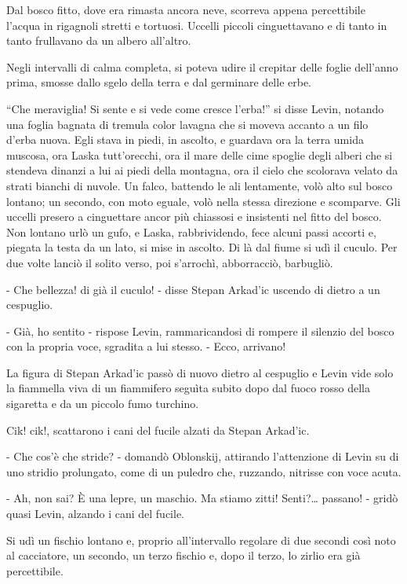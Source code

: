 Dal bosco fitto, dove era rimasta ancora neve, scorreva appena percettibile l'acqua in rigagnoli stretti e tortuosi. Uccelli piccoli cinguettavano e di tanto in tanto frullavano da un albero all'altro. 

Negli intervalli di calma completa, si poteva udire il crepitar delle foglie dell'anno prima, smosse dallo sgelo della terra e dal germinare delle erbe. 

``Che meraviglia! Si sente e si vede come cresce l'erba!'' si disse Levin, notando una foglia bagnata di tremula color lavagna che si moveva accanto a un filo d'erba nuova. Egli stava in piedi, in ascolto, e guardava ora la terra umida muscosa, ora Laska tutt'orecchi, ora il mare delle cime spoglie degli alberi che si stendeva dinanzi a lui ai piedi della montagna, ora il cielo che scolorava velato da strati bianchi di nuvole. Un falco, battendo le ali lentamente, volò alto sul bosco lontano; un secondo, con moto eguale, volò nella stessa direzione e scomparve. Gli uccelli presero a cinguettare ancor più chiassosi e insistenti nel fitto del bosco. Non lontano urlò un gufo, e Laska, rabbrividendo, fece alcuni passi accorti e, piegata la testa da un lato, si mise in ascolto. Di là dal fiume si udì il cuculo. Per due volte lanciò il solito verso, poi s'arrochì, abborracciò, barbugliò. 

- Che bellezza! di già il cuculo! - disse Stepan Arkad'ic uscendo di dietro a un cespuglio. 

- Già, ho sentito - rispose Levin, rammaricandosi di rompere il silenzio del bosco con la propria voce, sgradita a lui stesso. - Ecco, arrivano! 

La figura di Stepan Arkad'ic passò di nuovo dietro al cespuglio e Levin vide solo la fiammella viva di un fiammifero seguìta subito dopo dal fuoco rosso della sigaretta e da un piccolo fumo turchino. 

Cik! cik!, scattarono i cani del fucile alzati da Stepan Arkad'ic. 

- Che cos'è che stride? - domandò Oblonskij, attirando l'attenzione di Levin su di uno stridio prolungato, come di un puledro che, ruzzando, nitrisse con voce acuta. 

- Ah, non sai? È una lepre, un maschio. Ma stiamo zitti! Senti?\ldots{} passano! - gridò quasi Levin, alzando i cani del fucile. 

Si udì un fischio lontano e, proprio all'intervallo regolare di due secondi così noto al cacciatore, un secondo, un terzo fischio e, dopo il terzo, lo zirlio era già percettibile. 

